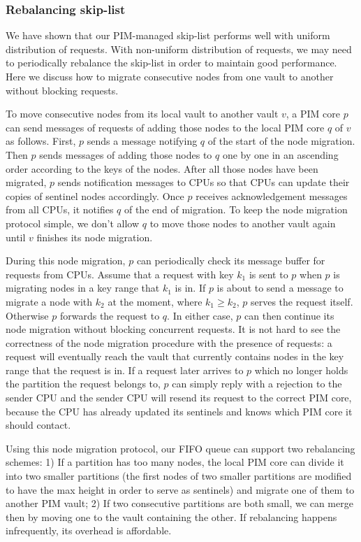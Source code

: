\subsubsection{Rebalancing skip-list}
We have shown that our PIM-managed skip-list performs well with uniform distribution of requests. 
With non-uniform distribution of requests, we may need to periodically rebalance the skip-list 
in order to maintain good performance. 
Here we discuss how to migrate consecutive nodes from one vault to another without blocking requests.  

To move consecutive nodes from its local vault to another vault $v$, a PIM core $p$ 
can send messages of requests of adding those nodes to the local PIM core $q$ of $v$ as follows. 
First, $p$ sends a message notifying $q$ of the start of the node migration. 
Then $p$ sends messages of adding those nodes to $q$ one by one in an ascending order 
according to the keys of the nodes. 
After all those nodes have been migrated, $p$ sends notification messages to CPUs so that 
CPUs can update their copies of sentinel nodes accordingly.
Once $p$ receives acknowledgement messages from all CPUs, it notifies $q$ of the end of migration.
To keep the node migration protocol simple, we don't allow $q$ to move those nodes 
to another vault again until $v$ finishes its node migration. 

During this node migration, $p$ can periodically check its message buffer for requests from CPUs.
Assume that a request with key $k_1$ is sent to $p$ when $p$ is migrating nodes 
in a key range that $k_1$ is in.  
If $p$ is about to send a message to migrate a node with $k_2$ at the moment, where $k_1 \ge k_2$, 
$p$ serves the request itself. 
Otherwise $p$ forwards the request to $q$. 
In either case, $p$ can then continue its node migration without blocking concurrent requests. 
It is not hard to see the correctness of the node migration procedure 
with the presence of requests: a request will eventually reach the vault that 
currently contains nodes in the key range that the request is in.
If a request later arrives to $p$ which no longer holds the partition the request belongs to, 
$p$ can simply reply with a rejection to the sender CPU and 
the sender CPU will resend its request to the correct PIM core, 
because the CPU has already updated its sentinels and knows which PIM core it should contact. 

Using this node migration protocol, our FIFO queue can support two rebalancing schemes:
1) If a partition has too many nodes, the local PIM core can divide it into two smaller  
partitions (the first nodes of two smaller partitions are modified to have the max height 
in order to serve as sentinels) and migrate one of them to another PIM vault; 
2) If two consecutive partitions are both small, we can merge then by moving one to the vault 
containing the other. 
If rebalancing happens infrequently, its overhead is affordable. 
